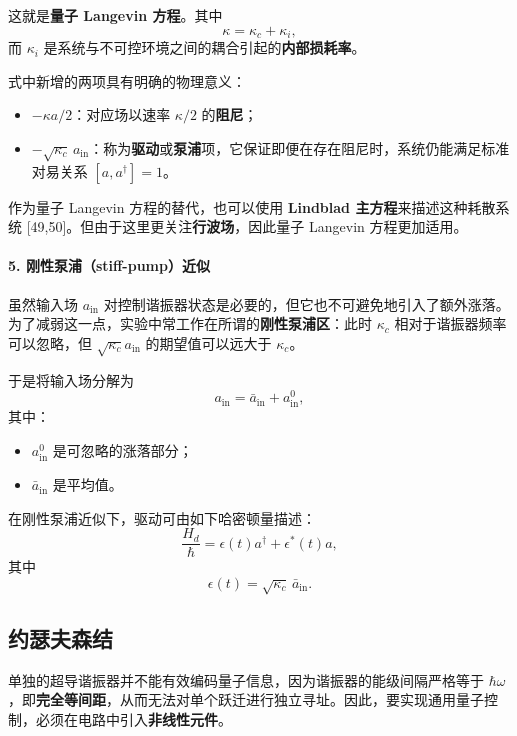 \documentclass[12pt,a4paper,oneside]{ctexbook}
\begin{document}
这就是\textbf{量子 Langevin 方程}。其中
\[
    \kappa=\kappa_c+\kappa_i,
\]
而 \(\kappa_i\) 是系统与不可控环境之间的耦合引起的\textbf{内部损耗率}。

式中新增的两项具有明确的物理意义：
\begin{itemize}[leftmargin=2em]
    \item \(-\kappa a/2\)：对应场以速率 \(\kappa/2\) 的\textbf{阻尼}；
    \item \(-\sqrt{\kappa_c}\,a_{\mathrm{in}}\)：称为\textbf{驱动}或\textbf{泵浦}项，它保证即便在存在阻尼时，系统仍能满足标准对易关系 \([a,a^\dagger]=1\)。
\end{itemize}

作为量子 Langevin 方程的替代，也可以使用 \textbf{Lindblad 主方程}来描述这种耗散系统 [49,50]。但由于这里更关注\textbf{行波场}，因此量子 Langevin 方程更加适用。

\paragraph{5. 刚性泵浦（stiff-pump）近似}

虽然输入场 \(a_{\mathrm{in}}\) 对控制谐振器状态是必要的，但它也不可避免地引入了额外涨落。为了减弱这一点，实验中常工作在所谓的\textbf{刚性泵浦区}：此时 \(\kappa_c\) 相对于谐振器频率可以忽略，但 \(\sqrt{\kappa_c}a_{\mathrm{in}}\) 的期望值可以远大于 \(\kappa_c\)。

于是将输入场分解为
\[
    a_{\mathrm{in}}=\bar a_{\mathrm{in}}+a_{\mathrm{in}}^{0},
\]
其中：
\begin{itemize}[leftmargin=2em]
    \item \(a_{\mathrm{in}}^{0}\) 是可忽略的涨落部分；
    \item \(\bar a_{\mathrm{in}}\) 是平均值。
\end{itemize}

在刚性泵浦近似下，驱动可由如下哈密顿量描述：
\begin{equation}
    \frac{H_d}{\hbar}
    =
    \epsilon(t)a^\dagger+\epsilon^*(t)a,
    \tag{10}
\end{equation}
其中
\[
    \epsilon(t)=\sqrt{\kappa_c}\,\bar a_{\mathrm{in}}.
\]

\subsection{约瑟夫森结}

单独的超导谐振器并不能有效编码量子信息，因为谐振器的能级间隔严格等于 \(\hbar\omega\)，即\textbf{完全等间距}，从而无法对单个跃迁进行独立寻址。因此，要实现通用量子控制，必须在电路中引入\textbf{非线性元件}。
\end{document}

